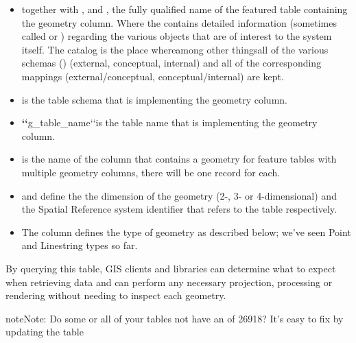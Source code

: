 \documentclass[a4paper,11pt,english]{sphinxmanual}
\begin{document}
\noindent{}
\begin{itemize}
\item {} 
 together with , and , the fully qualified name of the featured table containing the geometry column. Where the  contains detailed information (sometimes called  or ) regarding the various objects that are of interest to the system itself. The catalog is the place where\textendash{}among other things\textendash{}all of the various schemas () (external, conceptual, internal) and all of the corresponding mappings (external/conceptual, conceptual/internal) are kept.

\item {} 
 is the table schema that is implementing the geometry column.

\item {} 
{\color{red}\bfseries{}{}`{}`}g\_table\_name{}`{}`is the table name that is implementing the geometry column.

\item {} 
 is the name of the column that contains a geometry \textendash{} for feature tables with multiple geometry columns, there will be one record for each.

\item {} 
 and  define the the dimension of the geometry (2-, 3- or 4-dimensional) and the Spatial Reference system identifier that refers to the  table respectively.

\item {} 
The  column defines the type of geometry as described below; we’ve seen Point and Linestring types so far.

\end{itemize}

By querying this table, GIS clients and libraries can determine what to expect when retrieving data and can perform any necessary projection, processing or rendering without needing to inspect each geometry.

\begin{sphinxadmonition}{note}{Note:}
Do some or all of your  tables not have an  of 26918? It’s easy to fix by updating the table

\begin{sphinxVerbatim}[commandchars=\\\{\}]
 
\end{sphinxVerbatim}
\end{sphinxadmonition}
\end{document}

